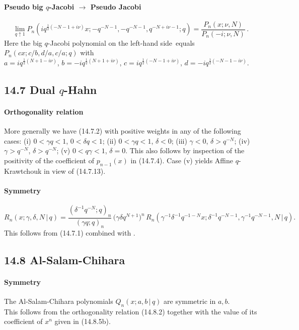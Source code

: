 \documentclass[twoside,11pt]{article}
\newcommand\sa{\smallskipamount}
\newcommand\sLP{\\[\sa]}
\newcommand\ga\gamma
\newcommand\de\delta
\newcommand\half{\frac12}
\newcommand\LHS{left-hand side}
\begin{document}
\paragraph{Pseudo big $q$-Jacobi $\longrightarrow$ Pseudo Jacobi}
\begin{equation}
\lim_{q\uparrow1}P_n(iq^{\half(-N-1+i\nu)}x;-q^{-N-1},-q^{-N-1},q^{-N+i\nu-1};q)
=\frac{P_n(x;\nu,N)}{P_n(-i;\nu,N)}\,.
\label{118}
\end{equation}
Here the big $q$-Jacobi polynomial on the \LHS\ equals
$P_n(cx;c/b,d/a,c/a;q)$ with\\
$a=iq^{\half(N+1-i\nu)}$, $b=-iq^{\half(N+1+i\nu)}$,
$c=iq^{\half(-N-1+i\nu)}$, $d=-iq^{\half(-N-1-i\nu)}$.
%
\subsection*{14.7 Dual $q$-Hahn}
\label{sec14.7}
\paragraph{Orthogonality relation}
More generally we have (14.7.2) with positive weights in any of the following
cases:
(i) $0<\ga q<1$, $0<\de q<1$;\quad
(ii) $0<\ga q<1$, $\de<0$;\quad
(iii) $\ga<0$, $\de>q^{-N}$;\quad
(iv) $\ga>q^{-N}$, $\de>q^{-N}$;\quad
(v) $0<q\ga<1$, $\de=0$.
This also follows by inspection of the positivity of the coefficient of
$p_{n-1}(x)$ in (14.7.4).
Case (v) yields Affine $q$-Krawtchouk in view of (14.7.13).
%
\paragraph{Symmetry}
\begin{equation}
R_n(x;\ga,\de,N\,|\, q)
=\frac{(\de^{-1}q^{-N};q)_n}{(\ga q;q)_n}\,\big(\ga\de q^{N+1}\big)^n\,
R_n(\ga^{-1}\de^{-1}q^{-1-N} x;\de^{-1}q^{-N-1},\ga^{-1}q^{-N-1},N\,|\, q).
\label{89}
\end{equation}
This follows from (14.7.1) combined with .
%
\subsection*{14.8 Al-Salam-Chihara}
\label{sec14.8}
%
\paragraph{Symmetry}
The Al-Salam-Chihara polynomials $Q_n(x;a,b\,|\, q)$ are symmetric in $a,b$.
\sLP
This follows from the orthogonality relation (14.8.2)
together with the value of its coefficient of $x^n$ given in (14.8.5b).
%
\end{document}
